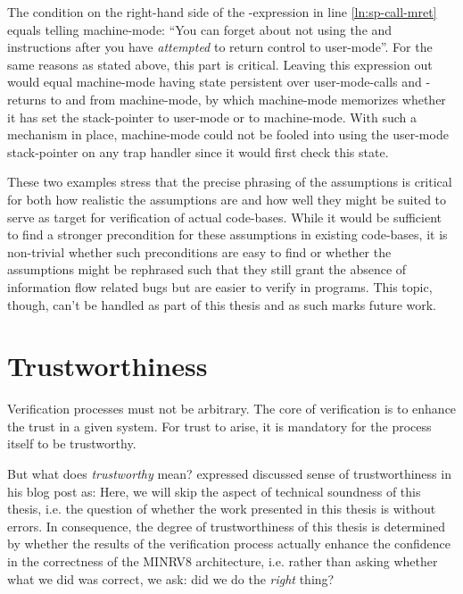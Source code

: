 The condition  on the right-hand side of the -expression in line \ref{ln:sp-call-mret} equals telling machine-mode: \enquote{You can forget about not using the  and  instructions after you have \textit{attempted} to return control to user-mode}.
For the same reasons as stated above, this part is critical.
Leaving this expression out would equal machine-mode having state persistent over user-mode-calls and -returns to and from machine-mode, by which machine-mode memorizes whether it has set the stack-pointer to user-mode or to machine-mode.
With such a mechanism in place, machine-mode could not be fooled into using the user-mode stack-pointer on any trap handler since it would first check this state.

These two examples stress that the precise phrasing of the assumptions is critical for both how realistic the assumptions are and how well they might be suited to serve as target for verification of actual code-bases.
While it would be sufficient to find a stronger precondition for these assumptions in existing code-bases, it is non-trivial whether such preconditions are easy to find or whether the assumptions might be rephrased such that they still grant the absence of information flow related bugs but are easier to verify in programs.
This topic, though, can't be handled as part of this thesis and as such marks future work.

\section{Trustworthiness}
\label{sec:trustworthiness}

Verification processes must not be arbitrary.
The core of verification is to enhance the trust in a given system.
For trust to arise, it is mandatory for the process itself to be trustworthy.

But what does \textit{trustworthy} mean?
\citeauthor{Piano} expressed discussed sense of trustworthiness in his blog post  as:
Here, we will skip the aspect of technical soundness of this thesis, i.e. the question of whether the work presented in this thesis is without errors.
In consequence, the degree of trustworthiness of this thesis is determined by whether the results of the verification process actually enhance the confidence in the correctness of the MINRV8 architecture, i.e. rather than asking whether what we did was correct, we ask: did we do the \textit{right} thing?

